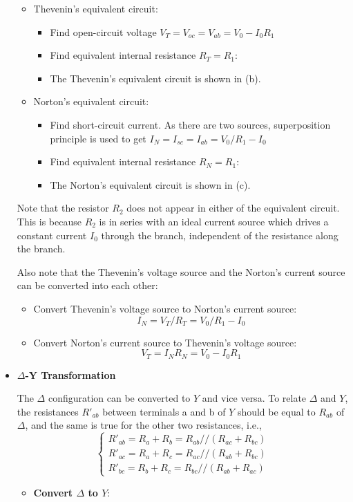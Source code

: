 \begin{itemize}
\begin{itemize}
\item Thevenin's equivalent circuit:
	\begin{itemize}
	\item Find open-circuit voltage $V_T=V_{oc}=V_{ab}=V_0-I_0R_1$
	\item Find equivalent internal resistance $R_T=R_1$:
	\item The Thevenin's equivalent circuit is shown in (b).
	\end{itemize}
\item Norton's equivalent circuit:
	\begin{itemize}
	\item Find short-circuit current. As there are two sources, 
	superposition principle is used to get $I_N=I_{sc}=I_{ab}=V_0/R_1-I_0$
	\item Find equivalent internal resistance $R_N=R_1$:
	\item The Norton's equivalent circuit is shown in (c).
	\end{itemize}
\end{itemize}
Note that the resistor $R_2$ does not appear in either of the equivalent
circuit. This is because $R_2$ is in series with an ideal current source
which drives a constant current $I_0$ through the branch, independent of
the resistance along the branch.

Also note that the Thevenin's voltage source and the Norton's current source
can be converted into each other:
\begin{itemize}
	\item Convert Thevenin's voltage source to Norton's current source:
	\[ I_N=V_T/R_T=V_0/R_1-I_0	\]
	\item Convert Norton's current source to Thevenin's voltage source:
	\[ V_T=I_N R_N=V_0-I_0R_1	\]
\end{itemize}

\item {\bf $\Delta$-Y Transformation}


The $\Delta$ configuration can be converted to $Y$ and vice versa. 
To relate $\Delta$ and $Y$, the resistances $R'_{ab}$ between terminals
a and b of $Y$ should be equal to $R_{ab}$ of $\Delta$, and the same is
true for the other two resistances, i.e.,
\[ \left\{ \begin{array}{rr}
	R'_{ab}=R_a+R_b=R_{ab}//(R_{ac}+R_{bc})	\\
	R'_{ac}=R_a+R_c=R_{ac}//(R_{ab}+R_{bc}) \\
	R'_{bc}=R_b+R_c=R_{bc}//(R_{ab}+R_{ac}) \end{array} \right. \]
\begin{itemize}
  \item {\bf Convert $\Delta$ to $Y$}: 


\end{itemize}
\end{itemize}

